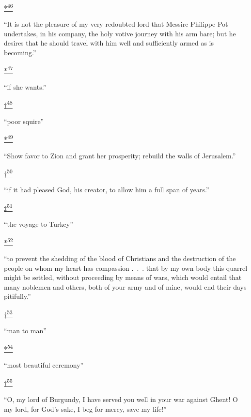 \protect\hypertarget{23_NOTES.xhtmlux5cux23id_2880}{\protect\hyperlink{10_Chapter_Three__THE_HEROIC_DREAM.xhtmlux5cux23id_2879}{*\textsuperscript{46}}}
``It is not the pleasure of my very redoubted lord that Messire Philippe
Pot undertakes, in his company, the holy votive journey with his arm
bare; but he desires that he should travel with him well and
sufficiently armed as is becoming.''

\protect\hypertarget{23_NOTES.xhtmlux5cux23id_2882}{\protect\hyperlink{10_Chapter_Three__THE_HEROIC_DREAM.xhtmlux5cux23id_2881}{*\textsuperscript{47}}}
``if she wants.''

\protect\hypertarget{23_NOTES.xhtmlux5cux23id_2884}{\protect\hyperlink{10_Chapter_Three__THE_HEROIC_DREAM.xhtmlux5cux23id_2883}{†\textsuperscript{48}}}
``poor squire''

\protect\hypertarget{23_NOTES.xhtmlux5cux23id_2886}{\protect\hyperlink{10_Chapter_Three__THE_HEROIC_DREAM.xhtmlux5cux23id_2885}{*\textsuperscript{49}}}
``Show favor to Zion and grant her prosperity; rebuild the walls of
Jerusalem.''

\protect\hypertarget{23_NOTES.xhtmlux5cux23id_2888}{\protect\hyperlink{10_Chapter_Three__THE_HEROIC_DREAM.xhtmlux5cux23id_2887}{†\textsuperscript{50}}}
``if it had pleased God, his creator, to allow him a full span of
years.''

\protect\hypertarget{23_NOTES.xhtmlux5cux23id_2890}{\protect\hyperlink{10_Chapter_Three__THE_HEROIC_DREAM.xhtmlux5cux23id_2889}{‡\textsuperscript{51}}}
``the voyage to Turkey''

\protect\hypertarget{23_NOTES.xhtmlux5cux23id_2892}{\protect\hyperlink{10_Chapter_Three__THE_HEROIC_DREAM.xhtmlux5cux23id_2891}{*\textsuperscript{52}}}
``to prevent the shedding of the blood of Christians and the destruction
of the people on whom my heart has compassion .~.~. that by my own body
this quarrel might be settled, without proceeding by means of wars,
which would entail that many noblemen and others, both of your army and
of mine, would end their days pitifully.''

\protect\hypertarget{23_NOTES.xhtmlux5cux23id_2894}{\protect\hyperlink{10_Chapter_Three__THE_HEROIC_DREAM.xhtmlux5cux23id_2893}{†\textsuperscript{53}}}
``man to man''

\protect\hypertarget{23_NOTES.xhtmlux5cux23id_2896}{\protect\hyperlink{10_Chapter_Three__THE_HEROIC_DREAM.xhtmlux5cux23id_2895}{*\textsuperscript{54}}}
``most beautiful ceremony''

\protect\hypertarget{23_NOTES.xhtmlux5cux23id_2898}{\protect\hyperlink{10_Chapter_Three__THE_HEROIC_DREAM.xhtmlux5cux23id_2897}{†\textsuperscript{55}}}
``O, my lord of Burgundy, I have served you well in your war against
Ghent! O my lord, for God's sake, I beg for mercy, save my life!''

